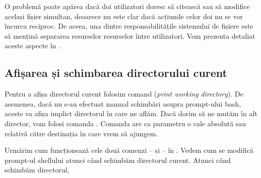 O problemă poate apărea dacă doi utilizatori doresc să citească sau să modifice același fișier simultan, deoarece nu este clar dacă acțiunile celor doi nu se vor încurca reciproc. De aceea, una dintre responsabilitățile sistemului de fișiere este să mențină separarea resurselor resurselor între utilizatori. Vom prezenta detaliat aceste aspecte în .

\subsection{Afișarea și schimbarea directorului curent}
\label{sec:fs:pwd-cd}

Pentru a afișa directorul curent folosim comand  (\textit{print working directory}). De asemenea, dacă nu s-au efectuat manual schimbări asupra prompt-ului bash, aceste va afișa implict directorul în care ne aflăm. Dacă dorim să ne mutăm în alt director, vom folosi comanda . Comanda  are ca parametru o cale absolută sau relativă către destinația în care vrem să ajungem.

Urmărim cum funcționează cele două comenzi --  și  -- în . Vedem cum se modifică prompt-ul shellului atunci când schimbăm directorul curent. Atunci când schimbăm directorul,


